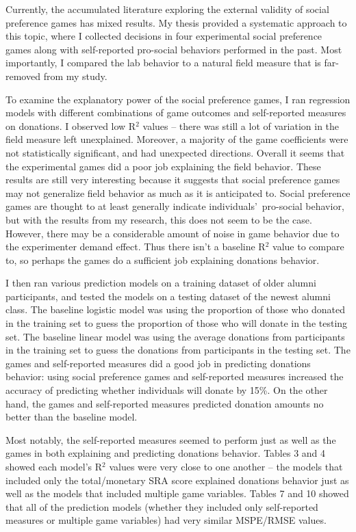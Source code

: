 \documentclass[12pt]{article}
\begin{document}
Currently, the accumulated literature exploring the external validity of social preference games has mixed results. My thesis provided a systematic approach to this topic, where I collected decisions in four experimental social preference games along with self-reported pro-social behaviors performed in the past. Most importantly, I compared the lab behavior to a natural field measure that is far-removed from my study.

To examine the explanatory power of the social preference games, I ran regression models with different combinations of game outcomes and self-reported measures on donations. I observed low R$^{2}$ values -- there was still a lot of variation in the field measure left unexplained. Moreover, a majority of the game coefficients were not statistically significant, and had unexpected directions. Overall it seems that the experimental games did a poor job explaining the field behavior. These results are still very interesting because it suggests that social preference games may not generalize field behavior as much as it is anticipated to. Social preference games are thought to at least generally indicate individuals\rq \ pro-social behavior, but with the results from my research, this does not seem to be the case. However, there may be a considerable amount of noise in game behavior due to the experimenter demand effect. Thus there isn\rq t a baseline R$^{2}$ value to compare to, so perhaps the games do a sufficient job explaining donations behavior.

I then ran various prediction models on a training dataset of older alumni participants, and tested the models on a testing dataset of the newest alumni class. The baseline logistic model was using the proportion of those who donated in the training set to guess the proportion of those who will donate in the testing set. The baseline linear model was using the average donations from participants in the training set to guess the donations from participants in the testing set. The games and self-reported measures did a good job in predicting donations behavior:  using social preference games and self-reported measures increased the accuracy of predicting whether individuals will donate by 15\%. On the other hand, the games and self-reported measures predicted donation amounts no better than the baseline model.

Most notably, the self-reported measures seemed to perform just as well as the games in both explaining and predicting donations behavior. Tables 3 and 4 showed each model\rq s R$^{2}$ values were very close to one another -- the models that included only the total/monetary SRA score explained donations behavior just as well as the models that included multiple game variables. Tables 7 and 10 showed that all of the prediction models (whether they included only self-reported measures or multiple game variables) had very similar MSPE/RMSE values.
\end{document}
